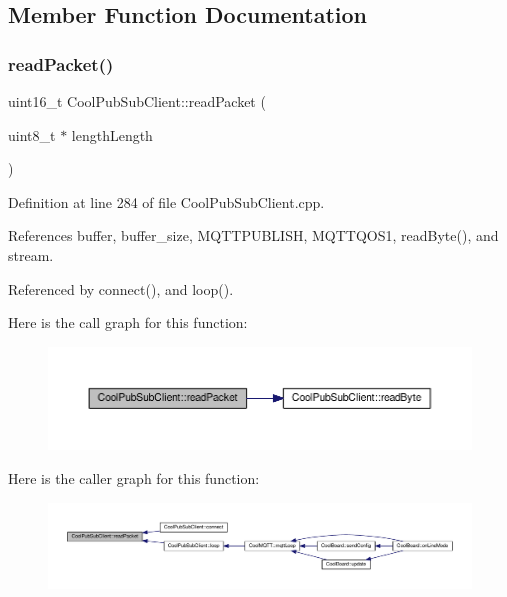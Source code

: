 \subsection{Member Function Documentation}
\mbox{\label{class_cool_pub_sub_client_a25a8779149cfa809b7c06f63568b25cf}} 
\subsubsection{\texorpdfstring{read\+Packet()}{readPacket()}}
{\footnotesize\ttfamily uint16\+\_\+t Cool\+Pub\+Sub\+Client\+::read\+Packet (\begin{DoxyParamCaption}\item[{uint8\+\_\+t $\ast$}]{length\+Length }\end{DoxyParamCaption})\hspace{0.3cm}{\ttfamily [private]}}



Definition at line 284 of file Cool\+Pub\+Sub\+Client.\+cpp.



References buffer, buffer\+\_\+size, M\+Q\+T\+T\+P\+U\+B\+L\+I\+SH, M\+Q\+T\+T\+Q\+O\+S1, read\+Byte(), and stream.



Referenced by connect(), and loop().

Here is the call graph for this function\+:\nopagebreak
\begin{figure}[H]
\begin{center}
\leavevmode
\includegraphics[width=350pt]{d8/d4b/class_cool_pub_sub_client_a25a8779149cfa809b7c06f63568b25cf_cgraph}
\end{center}
\end{figure}
Here is the caller graph for this function\+:
\nopagebreak
\begin{figure}[H]
\begin{center}
\leavevmode
\includegraphics[width=350pt]{d8/d4b/class_cool_pub_sub_client_a25a8779149cfa809b7c06f63568b25cf_icgraph}
\end{center}
\end{figure}
\mbox{\label{class_cool_pub_sub_client_ad409bbd287d5894f0cf082f62446c002}} 
